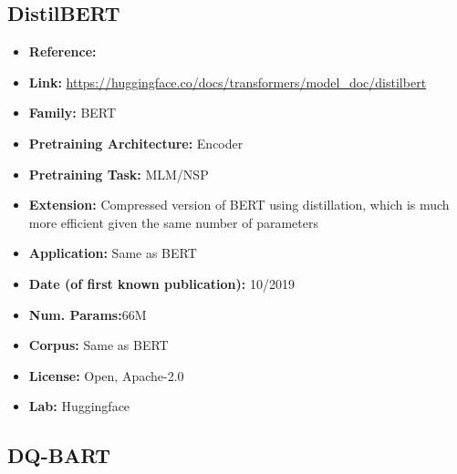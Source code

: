 \documentclass{article}
\begin{document}
\subsection{DistilBERT}
            \begin{itemize}
                \item \textbf{Reference:} 
                \item \textbf{Link:} \url{https://huggingface.co/docs/transformers/model_doc/distilbert}
                \item \textbf{Family:} BERT 
                \item \textbf{Pretraining Architecture:} Encoder
                \item \textbf{Pretraining Task:} MLM/NSP
                \item \textbf{Extension:} Compressed version of BERT using distillation, which is much more efficient given the same number of parameters  
                \item \textbf{Application:} Same as BERT
                \item \textbf{Date (of first known publication):} 10/2019
                \item \textbf{Num. Params:}66M
                \item \textbf{Corpus:} Same as BERT
                \item \textbf{License:} Open, Apache-2.0
                \item \textbf{Lab:} Huggingface
            \end{itemize}
            
\subsection{DQ-BART}
\end{document}
